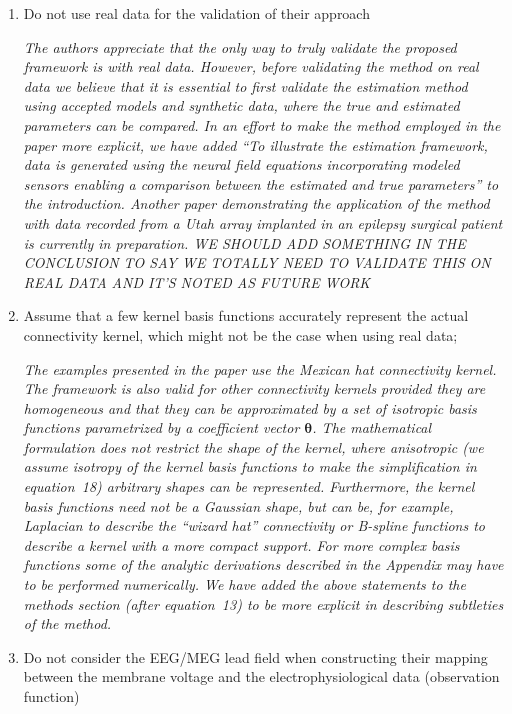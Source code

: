 \documentclass{article}
\begin{document}
    \begin{enumerate}
        \item Do not use real data for the validation of their approach

	\emph{The authors appreciate that the only way to truly validate the proposed framework is with real data. However, before validating the method on real data we believe that it is essential to first validate the estimation method using accepted models and synthetic data, where the true and estimated parameters can be compared. In an effort to make the method employed in the paper more explicit, we have added ``To illustrate the estimation framework, data is generated using the neural field equations incorporating modeled sensors enabling a comparison between the estimated and true parameters'' to the introduction. Another paper demonstrating the application of the method with data recorded from a Utah array implanted in an epilepsy surgical patient is currently in preparation.  WE SHOULD ADD SOMETHING IN THE CONCLUSION TO SAY WE TOTALLY NEED TO VALIDATE THIS ON REAL DATA AND IT'S NOTED AS FUTURE WORK}
	
        \item Assume that a few kernel basis functions accurately represent the actual connectivity kernel, which might not be the case when using real data;

	\emph{The examples presented in the paper use the Mexican hat connectivity kernel. The framework is also valid for other connectivity kernels provided they are homogeneous and that they can be approximated by a set of isotropic basis functions parametrized by a coefficient vector $\mathbf{\theta}$. The mathematical formulation does not restrict the shape of the kernel, where anisotropic (we assume isotropy of the kernel basis functions to make the simplification in equation~18) arbitrary shapes can be represented. Furthermore, the kernel basis functions need not be a Gaussian shape, but can be, for example, Laplacian to describe the ``wizard hat'' connectivity or B-spline functions to describe a kernel with a more compact support. For more complex basis functions some of the analytic derivations described in the Appendix may have to be performed numerically. We have added the above statements to the methods section (after equation~13) to be more explicit in describing subtleties of the method.}

        \item Do not consider the EEG/MEG lead field when constructing their mapping between the membrane voltage and the electrophysiological data (observation function)


\end{enumerate}
\end{document}
